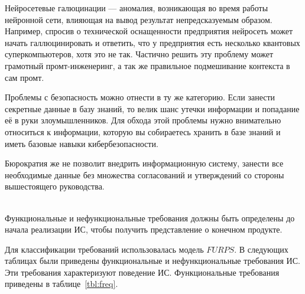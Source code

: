Нейросетевые галюцинации --- аномалия, возникающая во время работы нейронной 
сети, влияющая на вывод результат непредсказуемым образом. Например, спросив
о технической оснащенности предприятия нейросеть может начать галлюцинировать и
ответить, что у предприятия есть несколько квантовых суперкомпьютеров, хотя это 
не так. Частично решить эту проблему может грамотный промт-инженеринг, а так
же правильное подмешивание контекста в сам промт.

Проблемы с безопасность можно отнести в ту же категорию. Если занести секретные
данные в базу знаний, то велик шанс утечки информации и попадание её в руки 
злоумышленников. Для обхода этой проблемы нужно внимательно относиться к
информации, которую вы собираетесь хранить в базе знаний и иметь базовые навыки
кибербезопасности.

Бюрократия же не позволит внедрить информационную систему, занести все 
необходимые данные без множества согласований и утверждений со стороны 
вышестоящего руководства.

\\

Функциональные и нефункциональные требования должны быть определены до начала
реализации ИС, чтобы получить представление о конечном продукте.

Для классификации требований использовалась модель $FURPS$. В следующих 
таблицах были приведены функциональные и нефункциональные требования ИС. Эти 
требования характеризуют поведение ИС. Функциональные требования приведены 
в таблице~\ref{tbl:freq}.

